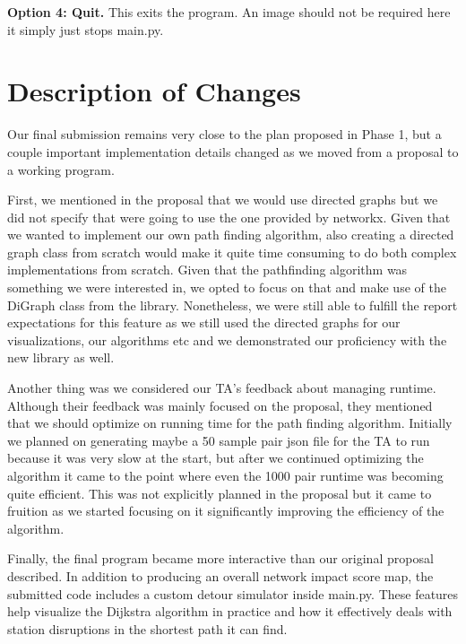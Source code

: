 \documentclass[fontsize=11pt]{article}
\begin{document}
\textbf{Option 4: Quit.}  
This exits the program. An image should not be required here it simply just stops main.py.

\vspace{1em}

\section*{Description of Changes}

Our final submission remains very close to the plan proposed in Phase 1, but a couple important implementation details changed as we moved from a proposal to a working program.

\vspace{1em}

First, we mentioned in the proposal that we would use directed graphs but we did not specify that were going to use the one provided by networkx. Given that we wanted to implement our own path finding algorithm, also creating a directed graph class from scratch would make it quite time consuming to do both complex implementations from scratch. Given that the pathfinding algorithm was something we were interested in, we opted to focus on that and make use of the DiGraph class from the library. Nonetheless, we were still able to fulfill the report expectations for this feature as we still used the directed graphs for our visualizations, our algorithms etc and we demonstrated our proficiency with the new library as well.

\vspace{1em}

Another thing was we considered our TA's feedback about managing runtime. Although their feedback was mainly focused on the proposal, they mentioned that we should optimize on running time for the path finding algorithm. Initially we planned on generating maybe a 50 sample pair json file for the TA to run because it was very slow at the start, but after we continued optimizing the algorithm it came to the point where even the 1000 pair runtime was becoming quite efficient. This was not explicitly planned in the proposal but it came to fruition as we started focusing on it significantly improving the efficiency of the algorithm.

\vspace{1em}

Finally, the final program became more interactive than our original proposal described. In addition to producing an overall network impact score map, the submitted code includes a custom detour simulator inside main.py. These features help visualize the Dijkstra algorithm in practice and how it effectively deals with station disruptions in the shortest path it can find. 
\end{document}
